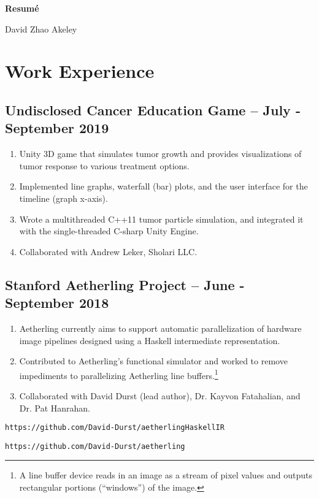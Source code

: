 \documentclass[11pt]{article}
\begin{document}
\begin{center}
\Large{\textbf{Resum\'e}}

\normalsize David Zhao Akeley
\end{center}

\section{Work Experience}

\subsection{Undisclosed Cancer Education Game -- July - September 2019}
\begin{enumerate}
\item Unity 3D game that simulates tumor growth and provides visualizations
  of tumor response to various treatment options.
\item Implemented line graphs, waterfall (bar) plots, and the user
  interface for the timeline (graph x-axis).
\item Wrote a multithreaded C++11 tumor particle simulation, and integrated
  it with the single-threaded C-sharp Unity Engine.
\item Collaborated with Andrew Leker, Sholari LLC.
\end{enumerate}

\subsection{Stanford Aetherling Project -- June - September 2018}
\begin{enumerate}
\item Aetherling currently aims to support automatic parallelization
  of hardware image pipelines designed using a Haskell intermediate
  representation.
\item Contributed to Aetherling's functional simulator and worked to
  remove impediments to parallelizing Aetherling line
  buffers.\footnote{A line buffer device reads in an image as a stream
    of pixel values and outputs rectangular portions (``windows'') of
    the image.}
\item Collaborated with David Durst (lead author), Dr. Kayvon
  Fatahalian, and Dr. Pat Hanrahan.
\end{enumerate}
\texttt{https://github.com/David-Durst/aetherlingHaskellIR}

\texttt{https://github.com/David-Durst/aetherling}
\end{document}
